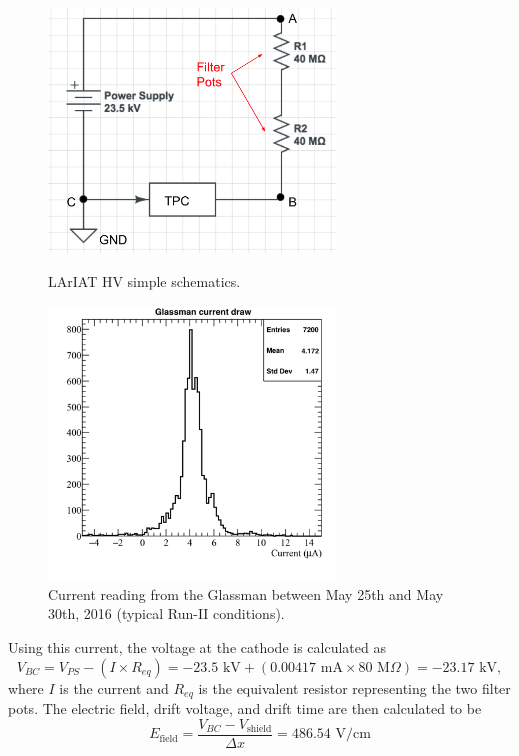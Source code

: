 \begin{figure}[h]
\centering
\begin{minipage}{0.45\textwidth}
\centering
\includegraphics[width=3in]{AppendixB-EField/Images/CircuitLArIAT.png}
\caption{LArIAT HV simple schematics.}
\label{fig:circuit}
\end{minipage}\hfill
\begin{minipage}{0.45\textwidth}
\centering
\includegraphics[width=3in]{AppendixB-EField/Images/glassman_current_20160525-30.png}
\caption{Current reading from the Glassman between May 25th and May 30th, 2016 (typical Run-II conditions).}
\label{fig:currentMeasurement}
\end{minipage}
\end{figure}

Using this current, the voltage at the cathode is calculated as
\begin{equation} \label{eq:VBC}
V_{BC}=V_{PS} - (I \times R_{eq}) = -23.5\text{ kV} + ( 0.00417\text{ mA} \times 80\text{ M}\Omega ) = -23.17\text{ kV}, 
\end{equation}
where $I$ is the current and $R_{eq}$ is the equivalent resistor representing the two filter pots. The electric field, drift voltage, and drift time are then calculated to be
\begin{equation}E_{\text{field}} = \frac{V_{BC} - V_{\text{shield}}}{\Delta x} = 486.54\text{ V/cm}
\end{equation}



